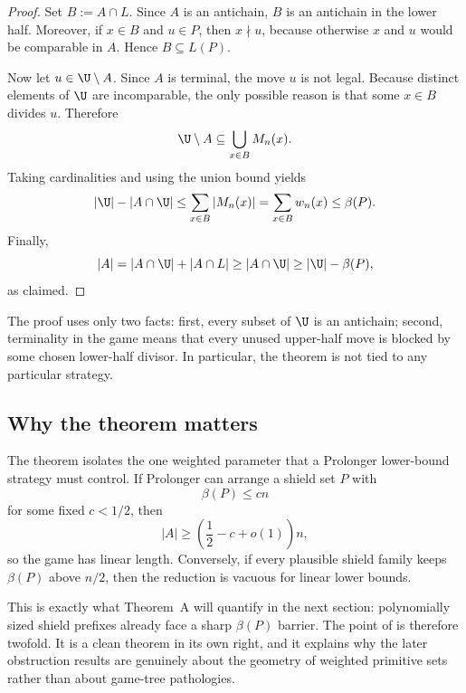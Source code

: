 \begin{proof}
Set $B := A \cap L$.  Since $A$ is an antichain, $B$ is an antichain in the
lower half.  Moreover, if $x \in B$ and $u \in P$, then $x \nmid u$, because
otherwise $x$ and $u$ would be comparable in $A$.  Hence $B \subseteq L(P)$.

Now let $u \in \U \setminus A$.  Since $A$ is terminal, the move $u$ is not
legal.  Because distinct elements of $\U$ are incomparable, the only possible
reason is that some $x \in B$ divides $u$.  Therefore
\[
  \U \setminus A \subseteq \bigcup_{x \in B} M_n(x).
\]
Taking cardinalities and using the union bound yields
\[
  |\U| - |A \cap \U|
  \le
  \sum_{x \in B} |M_n(x)|
  =
  \sum_{x \in B} w_n(x)
  \le
  \beta(P).
\]
Finally,
\[
  |A|
  =
  |A \cap \U| + |A \cap L|
  \ge
  |A \cap \U|
  \ge
  |\U| - \beta(P),
\]
as claimed.
\end{proof}

\begin{remark}
The proof uses only two facts: first, every subset of $\U$ is an antichain;
second, terminality in the game means that every unused upper-half move is
blocked by some chosen lower-half divisor.  In particular, the theorem is not
tied to any particular strategy.
\end{remark}

\subsection{Why the theorem matters}

The theorem isolates the one weighted parameter that a Prolonger lower-bound
strategy must control.  If Prolonger can arrange a shield set $P$ with
\[
  \beta(P) \le cn
\]
for some fixed $c<1/2$, then
\[
  |A| \ge \left(\frac12-c+o(1)\right)n,
\]
so the game has linear length.  Conversely, if every plausible shield family
keeps $\beta(P)$ above $n/2$, then the reduction is vacuous for linear lower
bounds.

This is exactly what Theorem~A will quantify in the next section: polynomially
sized shield prefixes already face a sharp $\beta(P)$ barrier.  The point of
 is therefore twofold.  It is a clean theorem in its
own right, and it explains why the later obstruction results are genuinely
about the geometry of weighted primitive sets rather than about game-tree
pathologies.
